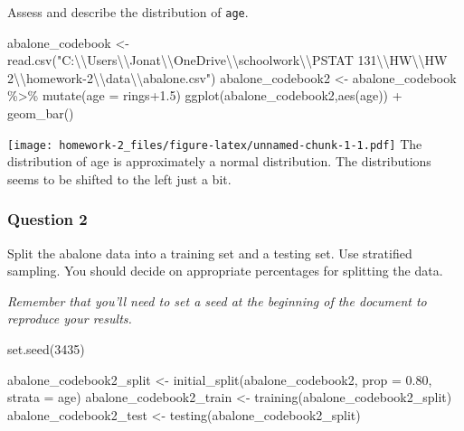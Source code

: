 \documentclass[
]{article}
\newenvironment{Shaded}{\begin{snugshade}}{\end{snugshade}}
\newcommand{\AttributeTok}[1]{\textcolor[rgb]{0.77,0.63,0.00}{#1}}
\newcommand{\DecValTok}[1]{\textcolor[rgb]{0.00,0.00,0.81}{#1}}
\newcommand{\FloatTok}[1]{\textcolor[rgb]{0.00,0.00,0.81}{#1}}
\newcommand{\FunctionTok}[1]{\textcolor[rgb]{0.00,0.00,0.00}{#1}}
\newcommand{\NormalTok}[1]{#1}
\newcommand{\OtherTok}[1]{\textcolor[rgb]{0.56,0.35,0.01}{#1}}
\newcommand{\SpecialCharTok}[1]{\textcolor[rgb]{0.00,0.00,0.00}{#1}}
\newcommand{\StringTok}[1]{\textcolor[rgb]{0.31,0.60,0.02}{#1}}
\begin{document}
Assess and describe the distribution of \texttt{age}.

\begin{Shaded}
\begin{Highlighting}[]
\NormalTok{abalone\_codebook }\OtherTok{\textless{}{-}} \FunctionTok{read.csv}\NormalTok{(}\StringTok{"C:}\SpecialCharTok{\textbackslash{}\textbackslash{}}\StringTok{Users}\SpecialCharTok{\textbackslash{}\textbackslash{}}\StringTok{Jonat}\SpecialCharTok{\textbackslash{}\textbackslash{}}\StringTok{OneDrive}\SpecialCharTok{\textbackslash{}\textbackslash{}}\StringTok{schoolwork}\SpecialCharTok{\textbackslash{}\textbackslash{}}\StringTok{PSTAT 131}\SpecialCharTok{\textbackslash{}\textbackslash{}}\StringTok{HW}\SpecialCharTok{\textbackslash{}\textbackslash{}}\StringTok{HW 2}\SpecialCharTok{\textbackslash{}\textbackslash{}}\StringTok{homework{-}2}\SpecialCharTok{\textbackslash{}\textbackslash{}}\StringTok{data}\SpecialCharTok{\textbackslash{}\textbackslash{}}\StringTok{abalone.csv"}\NormalTok{)}
\NormalTok{abalone\_codebook2 }\OtherTok{\textless{}{-}}\NormalTok{ abalone\_codebook }\SpecialCharTok{\%\textgreater{}\%}
  \FunctionTok{mutate}\NormalTok{(}\AttributeTok{age =}\NormalTok{ rings}\FloatTok{+1.5}\NormalTok{)}
\FunctionTok{ggplot}\NormalTok{(abalone\_codebook2,}\FunctionTok{aes}\NormalTok{(age)) }\SpecialCharTok{+} \FunctionTok{geom\_bar}\NormalTok{()}
\end{Highlighting}
\end{Shaded}

\texttt{[image: homework-2\_files/figure-latex/unnamed-chunk-1-1.pdf]}
The distribution of age is approximately a normal distribution. The
distributions seems to be shifted to the left just a bit.

\hypertarget{question-2}{%
\subsubsection{Question 2}\label{question-2}}

Split the abalone data into a training set and a testing set. Use
stratified sampling. You should decide on appropriate percentages for
splitting the data.

\emph{Remember that you'll need to set a seed at the beginning of the
document to reproduce your results.}

\begin{Shaded}
\begin{Highlighting}[]
\FunctionTok{set.seed}\NormalTok{(}\DecValTok{3435}\NormalTok{)}

\NormalTok{abalone\_codebook2\_split }\OtherTok{\textless{}{-}} \FunctionTok{initial\_split}\NormalTok{(abalone\_codebook2, }\AttributeTok{prop =} \FloatTok{0.80}\NormalTok{, }\AttributeTok{strata =}\NormalTok{ age)}
\NormalTok{abalone\_codebook2\_train }\OtherTok{\textless{}{-}} \FunctionTok{training}\NormalTok{(abalone\_codebook2\_split)}
\NormalTok{abalone\_codebook2\_test }\OtherTok{\textless{}{-}} \FunctionTok{testing}\NormalTok{(abalone\_codebook2\_split)}
\end{Highlighting}
\end{Shaded}
\end{document}
